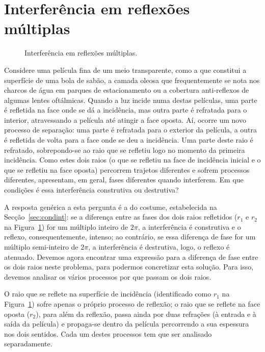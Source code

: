 \section{Interferência em reflexões múltiplas}
\begin{figure}
    {\centering
        
        \caption{Interferência em reflexões múltiplas.\label{fig:40-050}}

    }
\end{figure}
Considere uma película fina de um meio transparente, como a que constitui a
superfície de uma bola de sabão, a camada oleosa que frequentemente se nota nos
charcos de água em parques de estacionamento ou a cobertura anti-reflexos de
algumas lentes oftálmicas. Quando a luz incide numa destas películas, uma parte
é refletida na face onde se dá a incidência, mas outra parte é refratada para o
interior, atravessando a película até atingir a face oposta. Aí, ocorre um novo
processo de separação: uma parte é refratada para o exterior da película, a
outra é refletida de volta para a face onde se deu a incidência. Uma parte deste
raio é refratado, sobrepondo-se ao raio que se refletiu logo no momento da
primeira incidência. Como estes dois raios (o que se refletiu na face de
incidência inicial e o que se refletiu na face oposta) percorrem trajetos
diferentes e sofrem processos diferentes, apresentam, em geral, fases diferentes
quando interferem. Em que condições é essa interferência construtiva ou
destrutiva?

A resposta genérica a esta pergunta é a do costume, estabelecida na
Secção~\ref{sec:condint}: se a diferença entre as fases dos dois raios
refletidos ($r_1$ e $r_2$ na Figura~\ref{fig:40-050}) for um múltiplo inteiro de
$2\pi$, a interferência é construtiva e o reflexo, consequentemente, intenso; ao
contrário, se essa diferença de fase for um múltiplo semi-inteiro de $2\pi$, a
interferência é destrutiva, logo, o reflexo é atenuado. Devemos agora encontrar
uma expressão para a diferença de fase entre os dois raios neste problema, para
podermos concretizar esta solução. Para isso, devemos analisar os vários
processos por que passam os dois raios.

O raio que se reflete na superfície de incidência (identificado como $r_1$ na
Figura~\ref{fig:40-050}) sofre apenas o próprio processo de reflexão; o raio que
se reflete na face oposta ($r_2$), para além da reflexão, passa ainda por duas
refrações (à entrada e à saída da película) e propaga-se dentro da película
percorrendo a sua espessura nos dois sentidos. Cada um destes processos tem que
ser analisado separadamente.

